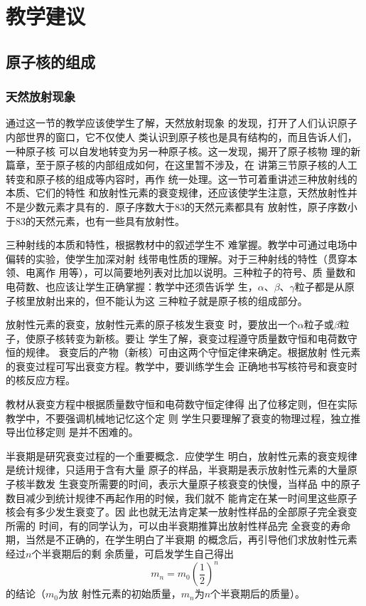 \section{教学建议}
\subsection{原子核的组成}
\subsubsection{天然放射现象}

通过这一节的教学应该使学生了解，天然放射现象
的发现，打开了人们认识原子内部世界的窗口，它不仅使人
类认识到原子核也是具有结构的，而且告诉人们，一种原子核
可以自发地转变为另一种原子核。这一发现，揭开了原子核物
理的新篇章，至于原子核的内部组成如何，在这里暂不涉及，在
讲第三节原子核的人工转变和原子核的组成等内容时，再作
统一处理。这一节可着重讲述三种放射线的本质、它们的特性
和放射性元素的衰变规律，还应该使学生注意，天然放射性并
不是少数元素才具有的．原子序数大于83的天然元素都具有
放射性，原子序数小于83的天然元素，也有一些具有放射性。

三种射线的本质和特性，根据教材中的叙述学生不
难掌握。教学中可通过电场中偏转的实验，使学生加深对射
线带电性质的理解。对于三种射线的特性（贯穿本领、电离作
用等），可以简要地列表对比加以说明。三种粒子的符号、质
量数和电荷数、也应该让学生正确掌握：教学中还须告诉学
生，$\alpha$、$\beta$、$\gamma$粒子都是从原子核里放射出来的，但不能认为这
三种粒子就是原子核的组成部分。

放射性元素的衰变，放射性元素的原子核发生衰变
时，要放出一个$\alpha$粒子或$\beta$粒子，使原子核转变为新核。要让
学生了解，衰变过程遵守质量数守恒和电荷数守恒的规律。
衰变后的产物（新核）可由这两个守恒定律来确定。根据放射
性元素的衰变过程可写出衰变方程。教学中，要训练学生会
正确地书写核符号和衰变时的核反应方程。

教材从衰变方程中根据质量数守恒和电荷数守恒定律得
出了位移定则，但在实际教学中，不要强调机械地记忆这个定
则 学生只要理解了衰变的物理过程，独立推导出位移定则
是并不困难的。

半衰期是研究衰变过程的一个重要概念．应使学生
明白，放射性元素的衰变规律是统计规律，只适用于含有大量
原子的样品，半衰期是表示放射性元素的大量原子核半数发
生衰变所需要的时间，表示大量原子核衰变的快慢，当样品
中的原子数目减少到统计规律不再起作用的时候，我们就不
能肯定在某一时间里这些原子核会有多少发生衰变了。因
此也就无法肯定某一放射性样品的全部原子完全衰变所需的
时间，有的同学认为，可以由半衰期推算出放射性样品完
全衰变的寿命期，当然是不正确的，在学生明白了半衰期
的概念后，再引导他们求放射性元素经过$n$个半衰期后的剩
余质量，可启发学生自己得出
\[m_n=m_0\left(\frac{1}{2}\right)^n\]
的结论（$m_0$为放
射性元素的初始质量，$m_n$为$n$个半衰期后的质量）。


